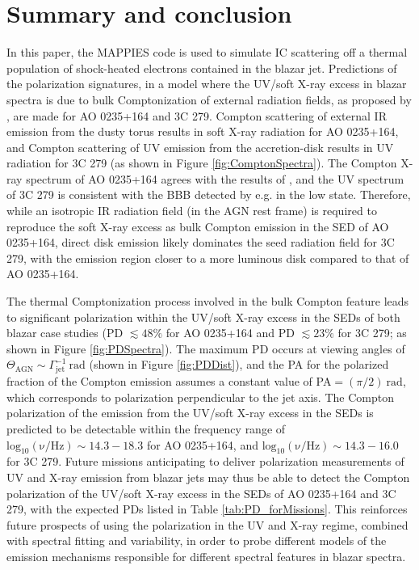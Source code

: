 \documentclass[twocolumn, tighten, twocolappendix]{aastex63}
\begin{document}
\section{Summary and conclusion}\label{sec:summary}
In this paper, the MAPPIES code is used to simulate IC scattering off a thermal population of shock-heated electrons contained in the blazar jet. Predictions of the polarization signatures, in a model where the UV/soft X-ray excess in blazar spectra is due to bulk Comptonization of external radiation fields, as proposed by \cite{Baring_etal2017}, are made for AO 0235+164 and 3C 279. Compton scattering of external IR emission from the dusty torus results in soft X-ray radiation for AO 0235+164, and Compton scattering of UV emission from the accretion-disk results in UV radiation for 3C 279 (as shown in Figure \ref{fig:ComptonSpectra}). The Compton X-ray spectrum of AO 0235+164 agrees with the results of \cite{Baring_etal2017}, and the UV spectrum of 3C 279 is consistent with the BBB detected by e.g. \cite{Pian_etal1999, Paliya_etal2015} in the low state. Therefore, while an isotropic IR radiation field (in the AGN rest frame) is required to reproduce the soft X-ray excess as bulk Compton emission in the SED of AO 0235+164, direct disk emission likely dominates the seed radiation field for 3C 279, with the emission region closer to a more luminous disk compared to that of AO 0235+164. 

The thermal Comptonization process involved in the bulk Compton feature leads to significant polarization within the UV/soft X-ray excess in the SEDs of both blazar case studies (PD $\lesssim 48\%$ for AO 0235+164 and PD $\lesssim 23\%$ for 3C 279; as shown in Figure \ref{fig:PDSpectra}). The maximum PD occurs at viewing angles of $\Theta_{\mathrm{AGN}} \sim \Gamma_{\mathrm{jet}}^{-1} ~\mathrm{rad}$ (shown in Figure \ref{fig:PDDist}), and the PA for the polarized fraction of the Compton emission assumes a constant value of PA$=(\pi/2) ~\mathrm{rad}$, which corresponds to polarization perpendicular to the jet axis. The Compton polarization of the emission from the UV/soft X-ray excess in the SEDs is predicted to be detectable within the frequency range of $\mathrm{log_{10}(\nu/ Hz)}\sim 14.3 - 18.3$ for AO 0235+164, and $\mathrm{log_{10}(\nu/ Hz)}\sim 14.3-16.0$ for 3C 279. Future missions anticipating to deliver polarization measurements of UV and X-ray emission from blazar jets may thus be able to detect the Compton polarization of the UV/soft X-ray excess in the SEDs of AO 0235+164 and 3C 279, with the expected PDs listed in Table \ref{tab:PD_forMissions}. This reinforces future prospects of using the polarization in the UV and X-ray regime, combined with spectral fitting and variability, in order to probe different models of the emission mechanisms responsible for different spectral features in blazar spectra.
\end{document}
